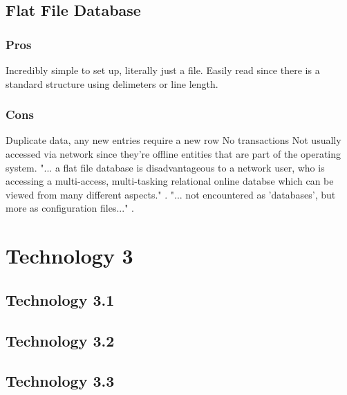 \documentclass[draftclsnofoot,onecolumn,letterpaper,10pt,compsoc]{IEEEtran}
\begin{document}
        
	\subsection{Flat File Database}
        \subsubsection{Pros}
            Incredibly simple to set up, literally just a file.
            Easily read since there is a standard structure using delimeters or line length.
    
        \subsubsection{Cons}
            Duplicate data, any new entries require a new row
            No transactions
            Not usually accessed via network since they're offline entities that are part of the operating system\cite{Techwalla}.
            "... a flat file database is disadvantageous to a network user, who is accessing a multi-access, multi-tasking relational online databse which can be viewed from many different aspects." \cite{Techwalla}.
            "... not encountered as 'databases', but more as configuration files..." \cite{Techwalla}.


\section{Technology 3}
	\subsection{Technology 3.1}
    
	\subsection{Technology 3.2}
	\subsection{Technology 3.3}

{}

\end{document}
